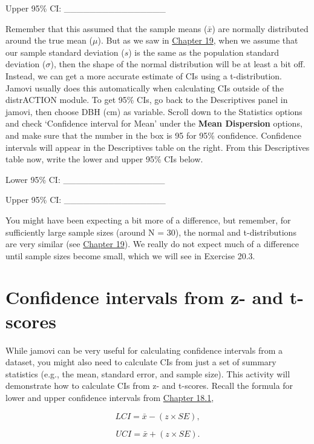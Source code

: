 \documentclass[
  openany]{krantz}
\begin{document}
Upper 95\% CI: \_\_\_\_\_\_\_\_\_\_\_\_\_\_\_\_

Remember that this assumed that the sample means (\(\bar{x}\)) are normally distributed around the true mean (\(\mu\)).
But as we saw in \protect\hyperlink{Chapter_19}{Chapter 19}, when we assume that our sample standard deviation (\(s\)) is the same as the population standard deviation (\(\sigma\)), then the shape of the normal distribution will be at least a bit off.
Instead, we can get a more accurate estimate of CIs using a t-distribution.
Jamovi usually does this automatically when calculating CIs outside of the distrACTION module.
To get 95\% CIs, go back to the Descriptives panel in jamovi, then choose DBH (cm) as variable.
Scroll down to the Statistics options and check `Confidence interval for Mean' under the \textbf{Mean Dispersion} options, and make sure that the number in the box is 95 for 95\% confidence.
Confidence intervals will appear in the Descriptives table on the right.
From this Descriptives table now, write the lower and upper 95\% CIs below.

Lower 95\% CI: \_\_\_\_\_\_\_\_\_\_\_\_\_\_\_\_

Upper 95\% CI: \_\_\_\_\_\_\_\_\_\_\_\_\_\_\_\_

You might have been expecting a bit more of a difference, but remember, for sufficiently large sample sizes (around N = 30), the normal and t-distributions are very similar (see \protect\hyperlink{Chapter_19}{Chapter 19}).
We really do not expect much of a difference until sample sizes become small, which we will see in Exercise 20.3.

\hypertarget{confidence-intervals-from-z--and-t-scores}{%
\section{Confidence intervals from z- and t-scores}\label{confidence-intervals-from-z--and-t-scores}}

While jamovi can be very useful for calculating confidence intervals from a dataset, you might also need to calculate CIs from just a set of summary statistics (e.g., the mean, standard error, and sample size).
This activity will demonstrate how to calculate CIs from z- and t-scores.
Recall the formula for lower and upper confidence intervals from \protect\hyperlink{normal-distribution-cis}{Chapter 18.1},

\[LCI = \bar{x} - (z \times SE),\]

\[UCI = \bar{x} + (z \times SE).\]
\end{document}
